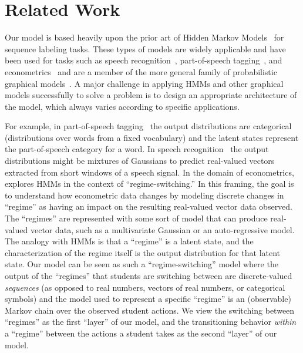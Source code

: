 \section{Related Work}

Our model is based heavily upon the prior art of Hidden Markov
Models~\cite{Rabiner:1990:RSR} for sequence labeling tasks. These types of
models are widely applicable and have been used for tasks such as speech
recognition~\cite{Huang:1990:HMM}, part-of-speech
tagging~\cite{Jurafsky:2009:SLP}, and econometrics~\cite{Hamilton:1990:JoE}
and are a member of the more general family of probabilistic graphical
models~\cite{Koller:2009:PGM}.  A major challenge in applying HMMs and
other graphical models successfully to solve a problem is to design an
appropriate architecture of the model, which always varies according to
specific applications.

For example, in part-of-speech tagging~\cite{Jurafsky:2009:SLP} the output
distributions are categorical (distributions over words from a fixed
vocabulary) and the latent states represent the part-of-speech category for
a word. In speech recognition~\cite{Huang:1990:HMM} the output
distributions might be mixtures of Gaussians to predict real-valued vectors
extracted from short windows of a speech signal. In the domain of
econometrics, \citet{Hamilton:1990:JoE} explores HMMs in the context of
``regime-switching.'' In this framing, the goal is to understand how
econometric data changes by modeling discrete changes in ``regime'' as
having an impact on the resulting real-valued vector data observed. The
``regimes'' are represented with some sort of model that can produce
real-valued vector data, such as a multivariate Gaussian or an
auto-regressive model. The analogy with HMMs is that a ``regime'' is a
latent state, and the characterization of the regime itself is the output
distribution for that latent state. Our model can be seen as such a
``regime-switching'' model where the output of the ``regimes'' that
students are switching between are discrete-valued \emph{sequences} (as
opposed to real numbers, vectors of real numbers, or categorical symbols)
and the model used to represent a specific ``regime'' is an (observable)
Markov chain over the observed student actions. We view the switching
between ``regimes'' as the first ``layer'' of our model, and the
transitioning behavior \emph{within} a ``regime'' between the actions a
student takes as the second ``layer'' of our model.

